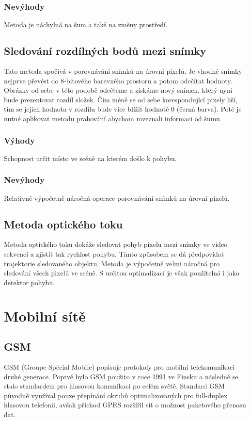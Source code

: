 \subsubsection{Nevýhody}
Metoda je náchylná na šum a také na změny prostředí.

\subsection*{Sledování rozdílných bodů mezi snímky}
Tato metoda spočívá v porovnáváni snímků na úrovni pixelů. Je vhodné snímky nejprve převést do 8-bitového barevného prostoru a potom odečítat hodnoty.  Obrázky od sebe v této podobě odečteme a získáme nový snímek, který nyní bude prezentovat rozdíl složek. Čím méně se od sebe korespondující pixely liší, tím se jejich hodnota v rozdílu bude více blížit hodnotě 0 (černá barva). Poté je nutné aplikovat metodu prahování abychom rozeznali informaci od šumu. \cite{fbmi_video}
\subsubsection{Výhody}
Schopnost určit místo ve scéně na kterém došlo k pohybu.
\subsubsection{Nevýhody}
Relativně výpočetně náročná operace porovnávání snímků na úrovni pixelů.

\subsection*{Metoda optického toku}

Metoda optického toku dokáže sledovat pohyb pixelu mezi snímky ve video sekvenci a zjistit tak rychlost pohybu. Tímto způsobem se dá předpovídat trajektorie sledovaného objektu. Metoda je výpočetně velmi náročná pro sledování všech pixelů ve scéně. S určitou optimalizací je však použitelná i jako detektor pohybu. 

\section{Mobilní sítě}
\subsection*{GSM}
GSM (Groupe Spécial Mobile) popisuje protokoly pro mobilní telekomunikaci druhé generace. Poprvé bylo GSM použito v roce 1991 ve Finsku a následně se stalo standardem pro hlasovou komunikaci po celém světě. Standard GSM původně využíval pouze přepínání okruhů optimalizovaných pro full-duplex hlasovou telefonii, avšak příchod GPRS rozšířil síť o možnost paketového přenosu dat.

